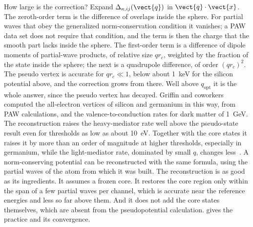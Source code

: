 How large is the correction? Expand $\Delta_{\kappa,ij}(\vect{q})$ in $\vect{q}\cdot\vect{x}$. The zeroth-order term is the difference of overlaps inside the sphere. For partial waves that obey the generalized norm-conservation condition it vanishes; a PAW data set does not require that condition, and the term is then the charge that the smooth part lacks inside the sphere. The first-order term is a difference of dipole moments of partial-wave products, of relative size $qr_c$, weighted by the fraction of the state inside the sphere; the next is a quadrupole difference, of order $(qr_c)^2$. The pseudo vertex is accurate for $qr_c \ll 1$, below about \SI{1}{keV} for the silicon potential above, and the correction grows from there. Well above $q_{\mathrm{opt}}$ it is the whole answer, since the pseudo vertex has decayed. Griffin and coworkers computed the all-electron vertices of silicon and germanium in this way, from PAW calculations, and the valence-to-conduction rates for dark matter of \SI{1}{GeV}. The reconstruction raises the heavy-mediator rate well above the pseudo-state result even for thresholds as low as about \SI{10}{eV}. Together with the core states it raises it by more than an order of magnitude at higher thresholds, especially in germanium, while the light-mediator rate, dominated by small $q$, changes less~\cite[Sects.~3.1 and~4]{griffin2021extended}. A norm-conserving potential can be reconstructed with the same formula, using the partial waves of the atom from which it was built. The reconstruction is as good as its ingredients. It assumes a frozen core. It restores the core region only within the span of a few partial waves per channel, which is accurate near the reference energies and less so far above them. And it does not add the core states themselves, which are absent from the pseudopotential calculation.  gives the practice and its convergence.

